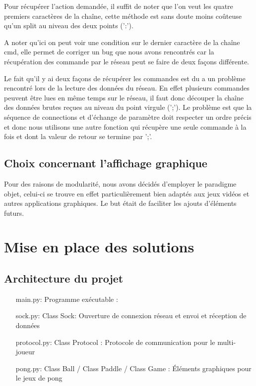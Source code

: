 \documentclass[12pt]{report}
\begin{document}
Pour récupérer l'action demandée, il suffit de noter que l'on veut les quatre premiers
caractères de la chaîne, cette méthode est sans doute moins coûteuse qu'un split
au niveau des deux points (':').

A noter qu'ici on peut voir une condition sur le dernier caractère de la chaîne
cmd, elle permet de corriger un bug que nous avons rencontrés car la récupération
des commande par le réseau peut se faire de deux façons différente.

Le fait qu'il y ai deux façons de récupérer les commandes est du a un
problème rencontré lors de la lecture des données du réseau. En effet
plusieurs commandes peuvent être lues en même temps sur le réseau, il faut
donc découper la chaîne des données brutes reçues au niveau du point virgule
(';').
Le problème est que la séquence de connections et d'échange de paramètre doit
respecter un ordre précis et donc nous utilisons une autre fonction qui 
récupère une seule commande à la fois et dont la valeur de retour se
termine par ';'.

\chapter{Choix concernant l'affichage graphique} 
Pour des raisons de modularité, nous avons décidés d'employer le
paradigme objet, celui-ci se trouve en effet particulièrement bien
adaptés aux jeux vidéos et autres applications graphiques. Le but
était de faciliter les ajouts d'éléments futurs.

\part{Mise en place des solutions}
\chapter{Architecture du projet}
\begin{itemize}
\item[main.py: ] Programme exécutable : 
\item[sock.py: ] Class Sock: Ouverture de connexion réseau et envoi
  et réception de données 
\item[protocol.py: ] Class Protocol : Protocole de communication pour le
  multi-joueur
\item[pong.py: ] Class Ball / Class Paddle / Class Game : Éléments graphiques
  pour le jeux de pong 
\end{itemize}
\end{document}
